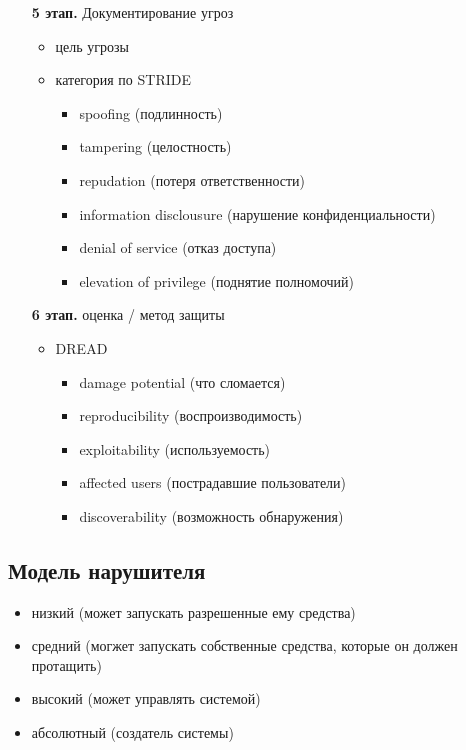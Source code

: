 \begin{enumerate}
    \item[\textbf{5 этап.}] Документирование угроз

        \begin{itemize}
            \item цель угрозы
            \item категория по STRIDE
                \begin{itemize}
                    \item spoofing (подлинность)
                    \item tampering (целостность)
                    \item repudation (потеря ответственности)
                    \item information disclousure (нарушение конфиденциальности)
                    \item denial of service (отказ доступа)
                    \item elevation of privilege (поднятие полномочий)
                \end{itemize}
        \end{itemize}

    \item[\textbf{6 этап.}] оценка / метод защиты

        \begin{itemize}
            \item DREAD

                \begin{itemize}
                    \item damage potential (что сломается)
                    \item reproducibility (воспроизводимость)
                    \item exploitability (используемость)
                    \item affected users (пострадавшие пользователи)
                    \item discoverability (возможность обнаружения)
                \end{itemize}
        \end{itemize}


\end{enumerate}

\subsection{Модель нарушителя}

\begin{itemize}
    \item низкий (может запускать разрешенные ему средства)
    \item средний (могжет запускать собственные средства, которые он должен протащить)
    \item высокий (может управлять системой)
    \item абсолютный (создатель системы)
\end{itemize}

